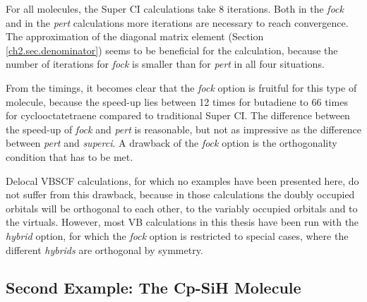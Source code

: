 For all molecules, the Super CI calculations take 8 iterations. Both in the \textit{fock} and in the \textit{pert} calculations more iterations are necessary to reach convergence. The approximation of the diagonal matrix element (Section \ref{ch2.sec.denominator}) seems to be beneficial for the calculation, because the number of iterations for \textit{fock} is smaller than for \textit{pert} in all four situations.

From the timings, it becomes clear that the \textit{fock} option is fruitful for this type of molecule, because the speed-up lies between 12 times for butadiene to 66 times for cyclooctatetraene compared to traditional Super CI. The difference between the speed-up of \textit{fock} and \textit{pert} is reasonable, but not as impressive as the difference between \textit{pert} and \textit{superci}. A drawback of the \textit{fock} option is the orthogonality condition that has to be met. 

Delocal VBSCF calculations, for which no examples have been presented here, do not suffer from this drawback, because in those calculations the doubly occupied orbitals will be orthogonal to each other, to the variably occupied orbitals and to the virtuals. However, most VB calculations in this thesis have been run with the \textit{hybrid} option, for which the \textit{fock} option is restricted to special cases, where the different \textit{hybrids} are orthogonal by symmetry.

\subsection{\label{ch2.sec.cyclopent}Second Example: The Cp-SiH Molecule}


